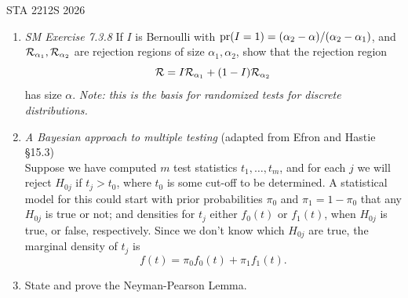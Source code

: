 \documentclass[12pt]{article}
\def\pr{{\rm pr}}
\def\Pr{{\rm pr}}
\begin{document}
 {\hfill STA 2212S 2026}\\


\bigskip

\begin{enumerate}

\item {\it SM Exercise 7.3.8} If $I$ is Bernoulli with $\Pr(I=1) = (\alpha_2-\alpha)/(\alpha_2-\alpha_1)$, and ${\cal R}_{\alpha_1}, {\cal R}_{\alpha_2}$ are rejection regions of size $\alpha_1, \alpha_2$, show that the rejection region $${\cal R} = I{\cal R}_{\alpha_1} + (1-I){\cal R}_{\alpha_2}$$ has size $\alpha$. {\it Note: this is the basis for randomized tests for discrete distributions.}
\item {\em  A Bayesian approach to  multiple testing} (adapted from Efron and Hastie \S 15.3)\\
Suppose we have computed $m$ test statistics $t_1, \dots, t_m$, and for each $j$ we will reject $H_{0j}$ if $t_j > t_0$, where $t_0$ is some cut-off to be determined. A statistical model for this could start with prior probabilities $\pi_0$ and $\pi_1 = 1-\pi_0$ that any $H_{0j}$ is true or not; and densities for $t_j$ either $f_0(t)$ or $f_1(t)$,  when $H_{0j}$ is true, or false, respectively. Since we don't know which $H_{0j}$ are true, the marginal density of $t_j$ is
\begin{equation}
f(t) = \pi_0 f_0(t) + \pi_1f_1(t).
\end{equation}

\item State and prove the Neyman-Pearson Lemma. 


\end{enumerate}
\end{document}
